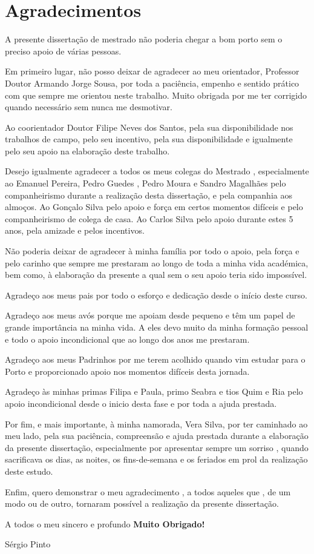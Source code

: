 \chapter*{Agradecimentos}

A presente dissertação de mestrado não poderia chegar a bom porto sem o preciso apoio de várias pessoas.

Em primeiro lugar, não posso deixar de agradecer ao meu orientador, Professor Doutor Armando Jorge Sousa, por toda a paciência, empenho e sentido prático com que sempre me orientou neste trabalho. Muito obrigada por me ter corrigido quando necessário sem nunca me desmotivar.

Ao coorientador Doutor Filipe Neves dos Santos, pela sua disponibilidade nos trabalhos de campo, pelo seu incentivo, pela sua disponibilidade e igualmente pelo seu apoio na elaboração deste trabalho.



Desejo igualmente agradecer a todos os meus colegas do Mestrado , especialmente ao Emanuel Pereira, Pedro Guedes , Pedro Moura e Sandro Magalhães pelo companheirismo durante a realização desta dissertação, e pela companhia aos almoços. Ao Gonçalo Silva pelo apoio e força em certos momentos difíceis e pelo companheirismo de colega de casa. Ao Carlos Silva pelo apoio durante estes 5 anos, pela amizade e pelos incentivos.

Não poderia deixar de agradecer à minha família por todo o apoio, pela força e pelo carinho que sempre me prestaram ao longo de toda a minha vida académica, bem como, à elaboração da presente a qual sem o seu apoio teria sido impossível.

Agradeço aos meus pais por todo o esforço e dedicação desde o início deste curso.

Agradeço aos meus avós porque me apoiam desde pequeno e têm um papel de grande importância na minha vida. A eles devo muito da minha formação pessoal e todo o apoio incondicional
que ao longo dos anos me prestaram.

Agradeço aos meus Padrinhos por me terem acolhido quando vim estudar
para o Porto e proporcionado apoio nos momentos difíceis desta jornada.

Agradeço às minhas primas Filipa e Paula, primo Seabra e tios Quim e Ria pelo apoio incondicional desde o inicio desta fase e por toda a ajuda prestada.


Por fim, e mais importante, à minha namorada, Vera Silva, por ter caminhado ao meu lado, pela sua paciência, compreensão e ajuda prestada durante a elaboração da presente dissertação, especialmente por apresentar sempre um sorriso , quando sacrificava os dias, as noites, os fins-de-semana e os feriados em prol da realização deste estudo. 

Enfim, quero demonstrar o meu agradecimento , a todos aqueles que , de um modo ou de outro, tornaram possível a realização da presente dissertação.


\vspace{80}
  
A todos o meu sincero e profundo \textbf{Muito Obrigado!}

Sérgio Pinto